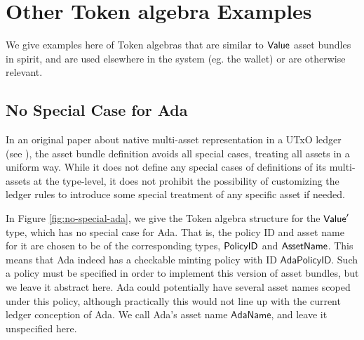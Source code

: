 \section{Other Token algebra Examples}
\label{sec:other-valmonoids}

We give examples here of Token algebras
that are similar to $\mathsf{Value}$ asset bundles in spirit, and are used elsewhere
in the system (eg. the wallet) or are otherwise relevant.

\subsection{No Special Case for Ada}

In an original paper about native multi-asset representation in a UTxO ledger
(see \cite{utxo_ma}), the asset bundle definition avoids all special cases, treating
all assets in a uniform way.
While it does not define any special cases of definitions of its multi-assets at the type-level,
it does not prohibit the possibility of customizing the ledger rules to introduce
some special treatment of any specific asset if needed.

In Figure \ref{fig:no-special-ada}, we give the Token algebra structure for
the $\mathsf{Value}'$ type, which has no special case for Ada. That is, the policy ID and
asset name for it are chosen to be of the corresponding types,
$\mathsf{PolicyID}$ and $\mathsf{AssetName}$. This means
that Ada indeed has a checkable minting policy with ID $\mathsf{AdaPolicyID}$.
Such a policy must be specified in
order to implement this version of asset bundles, but we leave it abstract here.
Ada could potentially have several asset names scoped under this policy, although
practically this would not line up with the current ledger conception of Ada.
We call Ada's asset name $\mathsf{AdaName}$, and leave it unspecified here.


